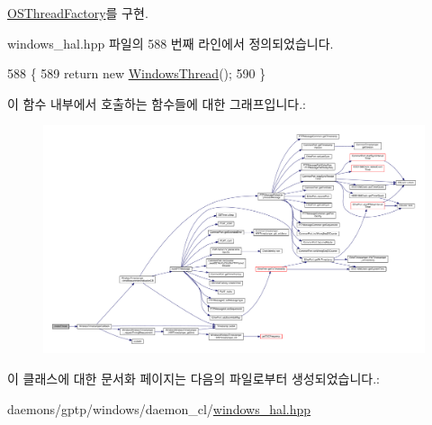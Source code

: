 \hyperlink{class_o_s_thread_factory_a1ba27e729a53bb92e06ac43b87b755fd}{O\+S\+Thread\+Factory}를 구현.



windows\+\_\+hal.\+hpp 파일의 588 번째 라인에서 정의되었습니다.


\begin{DoxyCode}
588                                    \{
589         \textcolor{keywordflow}{return} \textcolor{keyword}{new} \hyperlink{class_windows_thread}{WindowsThread}();
590     \}
\end{DoxyCode}


이 함수 내부에서 호출하는 함수들에 대한 그래프입니다.\+:
\nopagebreak
\begin{figure}[H]
\begin{center}
\leavevmode
\includegraphics[width=350pt]{class_windows_thread_factory_a4e5e89fc5ef1200ea5da0018da1cbb91_cgraph}
\end{center}
\end{figure}




이 클래스에 대한 문서화 페이지는 다음의 파일로부터 생성되었습니다.\+:\begin{DoxyCompactItemize}
\item 
daemons/gptp/windows/daemon\+\_\+cl/\hyperlink{windows__hal_8hpp}{windows\+\_\+hal.\+hpp}\end{DoxyCompactItemize}

